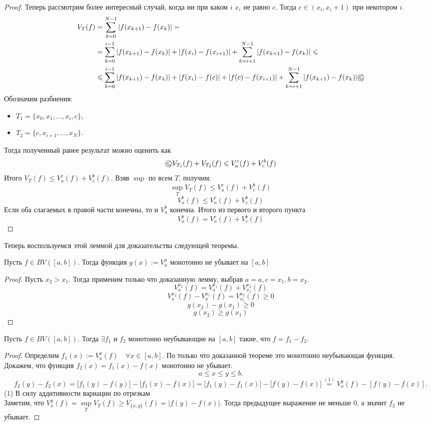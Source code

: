 \begin{proof}
    Теперь рассмотрим более интересный случай, когда ни при каком $i$ $x_i$ не равно $c$. Тогда $c \in (x_i, x_i + 1)$ при некотором $i$.
    \[\begin{aligned}
        V_T(f)
        & = \sum_{k=0}^{N - 1} | f(x_{k+1}) - f(x_k) | = \\
        & =
        \sum_{k=0}^{i - 1} |f(x_{k+1}) - f(x_k)| + |f(x_i) - f(x_{i+1})| +
        \sum_{k=i+1}^{N-1} |f(x_{k+1}) - f(x_k)| \leq \\
        & \leq
        \sum_{k=0}^{i - 1} |f(x_{k+1}) - f(x_k)| + |f(x_i) - f(c)| + |f(c) - f(x_{i+1})| +
        \sum_{k=i+1}^{N-1} |f(x_{k+1}) - f(x_k)|
        \incirc{\leq}
    \end{aligned}\]
    Обозначим разбиения:
    \begin{itemize}
        \item $T_1 = \{x_0, x_1, \dots, x_i, c\}$,
        \item $T_2 = \{c, x_{i+1}, \dots, x_N\}$.
    \end{itemize}
    Тогда полученный ранее результат можно оценить как
    \[
        \incirc{\leq} V_{T_1}(f) + V_{T_2}(f) \leq V_a^c(f) + V_c^b(f)
    \]
    Итого $V_T(f) \leq V_a^c(f) + V_c^b(f)$. Взяв $\sup$ по всем $T$, получим: \[
        \sup_T V_T(f) \leq V_a^c(f) + V_c^b(f)
    \]\[
        V_a^b(f) \leq V_a^c(f) + V_c^b(f)
    \]
    Если оба слагаемых в правой части конечны, то и $V_a^b$ конечна. Итого из первого и второго пункта \[
		V_a^b(f) = V_a^c(f) + V_c^b(f)
	\]
\end{proof}
Теперь воспользуемся этой леммой для доказательства следующей теоремы.
\begin{theorem}
	Пусть $f \in BV([a, b])$. Тогда функция $g(x) := V_a^x$ монотонно не убывает на $[a, b]$
\end{theorem}
\begin{proof}
	Пусть $x_2 > x_1$. Тогда применим только что доказанную лемму, выбрав $a = a, c = x_1, b = x_2$. \[
		V_a^{x_2} (f) = V_a^{x_1} (f) + V_{x_1}^{x_2} (f)
	\]\[
		V_a^{x_2} (f) - V_a^{x_1} (f) = V_{x_1}^{x_2}(f) \geq 0
	\]\[
		g(x_2) - g(x_1) \geq 0
	\]\[
		g(x_2) \geq g(x_1)
	\]
\end{proof}
\begin{theorem}
	Пусть $f \in BV([a, b])$. Тогда $\exists f_1$ и $f_2$ монотонно неубывающие на $[a, b]$ такие, что $f = f_1 - f_2$.
\end{theorem}
\begin{proof}
	Определим $f_1(x) := V_a^x(f) \quad \forall x \in [a,b]$. По только что доказанной теореме это монотонно неубывающая функция.\\
    	Докажем, что функция $f_2(x) = f_1(x) - f(x)$ монотонно не убывает.\[
		a \leq x \leq y \leq b.
	\]\[
		f_2(y) - f_2(x) = \bigg[f_1(y) - f(y)\bigg] - \bigg[f_1(x) - f(x)\bigg] = \bigg[f_1(y) - f_1(x)\bigg] - \bigg[f(y) - f(x)\bigg]
		\stackrel{(1)}{=}
		V_x^y(f) - [f(y) - f(x)].
	\]
	(1) В силу аддитивности вариации по отрезкам\\
	Заметим, что $V_x^y(f) = \sup\limits_T V_T(f) \geq V_{\{x, y\}}(f) = |f(y) - f(x)|$. Тогда предыдущее выражение не меньше 0, а значит $f_2$ не убывает.
\end{proof}
